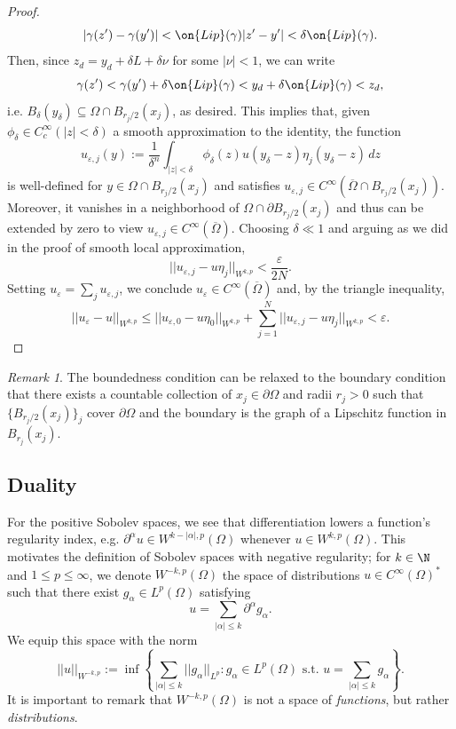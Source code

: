\documentclass[reqno]{amsart}
\theoremstyle{definition}
\theoremstyle{remark}
\newtheorem*{remark}{Remark}
\renewcommand{\epsilon}{\varepsilon}
\begin{document}
\begin{proof}
		\[ |\gamma(z') - \gamma(y')| < \on{Lip} (\gamma) |z' - y'| < \delta \on{Lip} (\gamma).  \]
	Then, since $z_d = y_d + \delta L +\delta \nu$ for some $|\nu| < 1$, we can write
		\[ \gamma(z') < \gamma(y') +\delta \on{Lip} (\gamma) < y_d +\delta \on{Lip} (\gamma) < z_d, \]
	i.e. $B_\delta (y_\delta) \subseteq \Omega \cap B_{r_j/2} (x_j)$, as desired. This implies that, given  $\phi_\delta \in C^\infty_c (|z| <\delta)$ a smooth approximation to the identity, the function
		\[ u_{\epsilon, j} (y) := \frac{1}{\delta^n} \int_{|z| < \delta} \phi_\delta (z) u  (y_\delta - z) \eta_j (y_\delta - z) \, dz\]
	is well-defined for $y \in \Omega \cap B_{r_j/2} (x_j)$ and satisfies $u_{\epsilon, j} \in C^\infty (\overline \Omega \cap B_{r_j/2} (x_j))$. Moreover, it vanishes in a neighborhood of $\Omega \cap \partial B_{r_j/2} (x_j)$ and thus can be extended by zero to view $u_{\epsilon, j} \in C^\infty (\overline \Omega)$. Choosing $\delta \ll 1$ and arguing as we did in the proof of smooth local approximation, 
		\[ || u_{\epsilon, j} - u \eta_j ||_{W^{k, p}} < \frac{\epsilon}{2N}. \]
	Setting $u_\epsilon = \sum_j u_{\epsilon, j}$, we conclude $u_\epsilon \in C^\infty (\overline \Omega)$ and, by the triangle inequality, 
		\[ ||u_\epsilon - u||_{W^{k, p}} \leq ||u_{\epsilon, 0} - u \eta_0||_{W^{k, p}} + \sum_{j  = 1}^N ||u_{\epsilon, j} - u \eta_j||_{W^{k, p}} < \epsilon . \]
\end{proof}

\begin{remark}
	The boundedness condition can be relaxed to the boundary condition that there exists a countable collection of $x_j \in \partial \Omega$ and radii $r_j > 0$ such that $\{ B_{r_j/2}(x_j) \}_j$ cover $\partial \Omega$ and the boundary is the graph of a Lipschitz function in $B_{r_j} (x_j)$. 
\end{remark}




\subsection{Duality}

For the positive Sobolev spaces, we see that differentiation lowers a function's regularity index, e.g. $\partial^\alpha u \in W^{k - |\alpha|, p} (\Omega)$ whenever $u \in W^{k,p} (\Omega)$. This  motivates the definition of Sobolev spaces with negative regularity; for $k \in \N$ and $1 \leq p \leq \infty$, we denote $W^{-k, p} (\Omega)$ the space of distributions $u \in C^\infty (\Omega)^*$ such that there exist $g_\alpha \in L^p (\Omega)$ satisfying
	\[ u = \sum_{|\alpha| \leq k} \partial^\alpha g_\alpha. \]
We equip this space with the norm
	\[ || u||_{W^{-k, p}} := \inf \left\{ \sum_{|\alpha| \leq k} ||g_\alpha||_{L^p} : g_\alpha \in L^p (\Omega) \text{ s.t. } u = \sum_{|\alpha| \leq k} g_\alpha \right\} .\]	
It is important to remark that $W^{-k, p} (\Omega)$ is not a space of \textit{functions}, but rather \textit{distributions}. 
\end{document}
